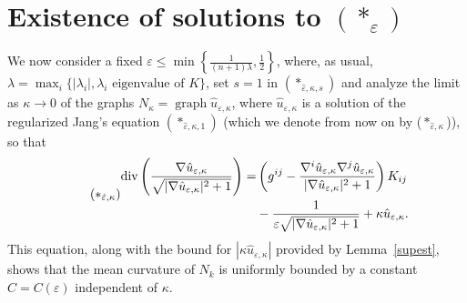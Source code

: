 \documentclass[11pt]{amsart}
\renewcommand{\epsilon}{\varepsilon}
\DeclareMathOperator{\graph}{graph} \DeclareMathOperator{\closure}{Closure}
\def\e{\epsilon}
\def\l{\lambda}
\def\k{\kappa}
\begin{document}
\section{Existence of solutions to $(*_{\varepsilon})$}\label{eexistencesection}
We now consider a fixed $\e\le \min\left\{\frac{1}{(n+1)\lambda},\frac12\right\}$, where, as usual, $\lambda=\max_i\{|\l_i|, \l_i\text{  eigenvalue of  } K\}$, set $s=1$ in $(*_{\hat{\varepsilon},\kappa,s})$ and analyze the limit as $\kappa\to0$ of the graphs $N_{\kappa}=\graph\hat{u}_{\varepsilon,\kappa}$, where $\hat{u}_{\varepsilon,\kappa}$ is a solution of the regularized Jang's equation $(*_{\hat{\varepsilon},\kappa,1})$ (which we denote from now on by (${*_{\hat{\varepsilon},\kappa}}$)), so that
\begin{equation} \tag{${*_{\hat{\varepsilon},\kappa}}$}
\begin{aligned}
 \mbox{div}\left(\dfrac{\nabla \hat{u}_{\varepsilon,\kappa}}{\sqrt{|\nabla \hat{u}_{\varepsilon,\kappa}|^2+1}}\right)=&\left(g^{ij}-\dfrac{\nabla^i\hat{u}_{\varepsilon,\kappa}\nabla^j\hat{u}_{\varepsilon,\kappa}}{|\nabla \hat{u}_{\e, \k}|^2+1}\right)K_{ij}\\
 &-\dfrac{1}{\varepsilon\sqrt{|\nabla \hat{u}_{\varepsilon,\kappa}|^2+1}}+\kappa\hat{u}_{\varepsilon,\kappa}.\end{aligned}
\end{equation}
This equation, along with the bound for $|\kappa \hat u_{\e,\k}|$ provided by Lemma~\ref{supest}, shows that the mean curvature of $N_k$ is uniformly bounded by a constant $C= C(\e)$ independent of $\k$. 
\end{document}
